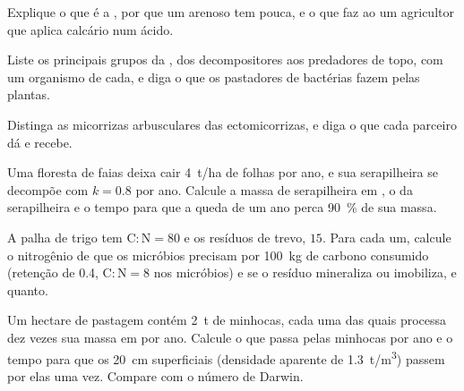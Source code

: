 \begin{exercise}[$\star$]\label{exo:b2:living-soil:2}
Explique o que é a , por que um 
arenoso tem pouca, e o que faz ao  um agricultor que aplica calcário
num  ácido.
\end{exercise}

\begin{exercise}[$\star$]\label{exo:b2:living-soil:3}
Liste os principais grupos da , dos decompositores
aos predadores de topo, com um organismo de cada, e diga o que os
pastadores de bactérias fazem pelas plantas.
\end{exercise}

\begin{exercise}[$\star$]\label{exo:b2:living-soil:4}
Distinga as micorrizas arbusculares das ectomicorrizas, e diga o que
cada parceiro dá e recebe.
\end{exercise}

\begin{exercise}[$\star\star$]\label{exo:b2:living-soil:5}
Uma floresta de faias deixa cair \qty{4}{t/ha} de folhas por ano, e sua
serapilheira se decompõe com $k = 0.8$ por ano. Calcule a massa de
serapilheira em , o  da
serapilheira e o tempo para que a queda de um ano perca \qty{90}{\%} de
sua massa.
\end{exercise}

\begin{exercise}[$\star\star$]\label{exo:b2:living-soil:6}
A palha de trigo tem $\mathrm{C:N} = 80$ e os resíduos de trevo, $15$.
Para cada um, calcule o nitrogênio de que os micróbios precisam por
\qty{100}{kg} de carbono consumido (retenção de 0.4, $\mathrm{C:N} = 8$
nos micróbios) e se o resíduo mineraliza ou imobiliza, e quanto.
\end{exercise}

\begin{exercise}[$\star\star$]\label{exo:b2:living-soil:7}
Um hectare de pastagem contém \qty{2}{t} de minhocas, cada uma das quais
processa dez vezes sua massa em  por ano. Calcule o  que passa
pelas minhocas por ano e o tempo para que os \qty{20}{cm} superficiais
(densidade aparente de \qty{1.3}{t/m^3}) passem por elas uma vez.
Compare com o número de Darwin.
\end{exercise}

